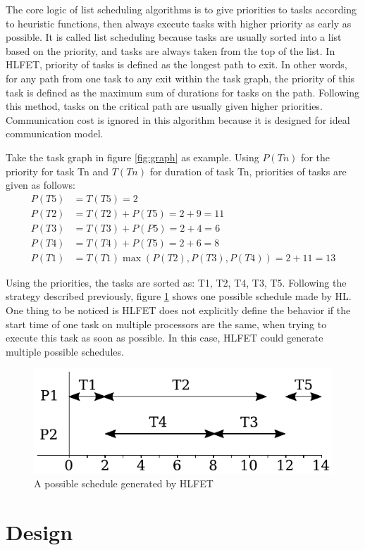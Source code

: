 \documentclass[msc,deptreport, cs]{infthesis}
\begin{document}
The core logic of list scheduling algorithms is to give priorities to tasks according to heuristic functions, then always execute tasks with higher priority as early as possible. It is called list scheduling because tasks are usually sorted into a list based on the priority, and tasks are always taken from the top of the list. In HLFET, priority of tasks is defined as the longest path to exit. In other words, for any path from one task to any exit within the task graph, the priority of this task is defined as the maximum sum of durations for tasks on the path. Following this method, tasks on the critical path are usually given higher priorities. Communication cost is ignored in this algorithm because it is designed for ideal communication model.

Take the task graph in figure \ref{fig:graph} as example. Using $P(Tn)$ for the priority for task Tn and $T(Tn)$ for duration of task Tn, priorities of tasks are given as follows:
\begin{align*}
P(T5) &= T(T5) = 2\\
P(T2) &= T(T2) + P(T5) = 2 + 9 = 11\\
P(T3) &= T(T3) + P(P5) = 2 + 4 = 6\\
P(T4) &= T(T4) + P(T5) = 2 + 6 = 8\\
P(T1) &= T(T1) \max(P(T2), P(T3), P(T4)) = 2 + 11 = 13
\end{align*}

Using the priorities, the tasks are sorted as: T1, T2, T4, T3, T5. Following the strategy described previously, figure \ref{fig:schedule1-2} shows one possible schedule made by HL. One thing to be noticed is HLFET does not explicitly define the behavior if the start time of one task on multiple processors are the same, when trying to execute this task as soon as possible. In this case, HLFET could generate multiple possible schedules.

\begin{figure}[!htb]
  \centering
  \includegraphics[width=0.45\columnwidth]{schedule1-2.pdf}
  \caption{A possible schedule generated by HLFET}
  \label{fig:schedule1-2}
\end{figure}

\chapter{Design}
\end{document}
